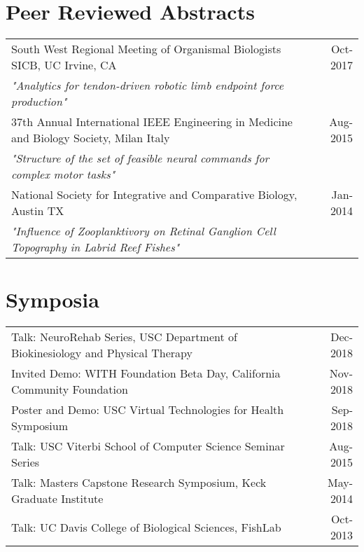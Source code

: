 \documentclass[10pt,a4paper]{article}
\begin{document}
  \vspace*{2mm}\section*{Peer Reviewed Abstracts}

  \vspace*{1mm}\noindent\begin{tabularx}{17cm}{X r}
    
	  South West Regional Meeting of Organismal Biologists SICB, UC Irvine, CA & Oct-2017 \\ %
    \textit{"Analytics for tendon-driven robotic limb endpoint force production"}\\[2mm]
    37th Annual International IEEE Engineering in Medicine and Biology Society, Milan Italy & Aug-2015 \\  %
    \textit{"Structure of the set of feasible neural commands for complex motor tasks"}\\[2mm]
    National Society for Integrative and Comparative Biology, Austin TX & Jan-2014 \\  %
    \textit{"Influence of Zooplanktivory on Retinal Ganglion Cell Topography in Labrid Reef Fishes"}\\[2mm]
  \end{tabularx}

  \vspace*{2mm}\section*{Symposia}

  \vspace*{1mm}\noindent\begin{tabularx}{17cm}{X r}
  Talk: NeuroRehab Series, USC Department of Biokinesiology and Physical Therapy & Dec-2018\\%
    Invited Demo: WITH Foundation Beta Day, California Community Foundation & Nov-2018\\
    Poster and Demo: USC Virtual Technologies for Health Symposium & Sep-2018 \\
    Talk: USC Viterbi School of Computer Science Seminar Series & Aug-2015 \\
    Talk: Masters Capstone Research Symposium, Keck Graduate Institute & May-2014 \\
    Talk: UC Davis College of Biological Sciences, FishLab & Oct-2013 \\
  \end{tabularx}
\end{document}
